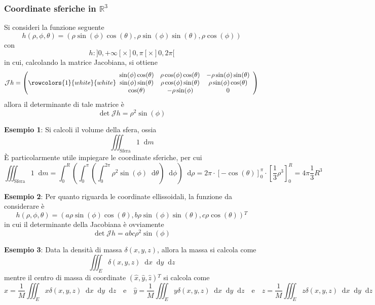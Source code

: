 \documentclass[a4paper]{extarticle}
\newcommand*\dif{\mathop{}\!\mathrm{d}}
\begin{document}
\subsubsection{Coordinate sferiche in $\mathbb{R}^3$}
Si consideri la funzione seguente
\[h(\rho,\phi,\theta) = (\rho \sin(\phi) \cos (\theta), \rho \sin(\phi) \sin(\theta), \rho \cos(\phi))\]
con
\[h : ]0,+\infty[ \times ]0,\pi[ \times ]0,2\pi[\]
in cui, calcolando la matrice Jacobiana, si ottiene
\[
    \mathcal{J} h = \left(\rowcolors{1}{white}{white}
    \begin{array}{ccc}
       \sin(\phi)\cos(\theta) & \rho \cos(\phi) \cos(\theta) & - \rho \sin(\phi) \sin(\theta)\\
       \sin(\phi)\sin(\theta) & \rho\cos(\phi)\sin(\theta) & \rho \sin(\phi) \cos(\theta)\\
       \cos(\theta) & -\rho\sin(\phi) & 0
    \end{array}
    \right)
\]
allora il determinante di tale matrice è
\[\det \mathcal{J} h = \rho^2 \sin(\phi)\]

\vspace{2em}
\noindent
\textbf{Esempio 1}: Si calcoli il volume della sfera, ossia
\[\iiint_{\text{Sfera}} 1 \dif m\]
È particolarmente utile impiegare le coordinate sferiche, per cui
\[\iiint_{\text{Sfera}} 1 \dif m = \int_0^R \left( \int_0^\pi \left( \int_0^{2\pi} \rho^2 \sin(\phi) \dif \theta \right) \dif \phi \right) \dif \rho = 2\pi \cdot [-\cos(\theta)]_0^\pi \cdot \left[\dfrac{1}{3} \rho^3\right]_0^R = 4 \pi \dfrac{1}{3} R^3\]

\vspace{2em}
\noindent
\textbf{Esempio 2}: Per quanto riguarda le coordinate ellissoidali, la funzione da considerare è
\[h(\rho,\phi,\theta) = (a \rho \sin(\phi) \cos(\theta), b \rho \sin(\phi) \sin(\theta), c \rho \cos(\theta)){^T}\]
in cui il determinante della Jacobiana è ovviamente
\[\det \mathcal{J} h = abc \rho^2 \sin(\phi)\]

\vspace{2em}
\noindent
\textbf{Esempio 3}: Data la densità di massa $\delta(x,y,z)$, allora la massa si calcola come
\[\iiint_E \delta(x,y,z) \dif x \dif y \dif z\]
mentre il centro di massa di coordinate $(\hat x,\hat y,\hat z){^T}$ si calcola come
\[\hat x = \dfrac{1}{M} \iiint_E x \delta(x,y,z) \dif x \dif y \dif z \hspace{1em} \text{e} \hspace{1em} \hat y = \dfrac{1}{M} \iiint_E y \delta(x,y,z) \dif x \dif y \dif z \hspace{1em} \text{e} \hspace{1em} \hat z = \dfrac{1}{M} \iiint_E z \delta(x,y,z) \dif x \dif y \dif z\]
\end{document}
